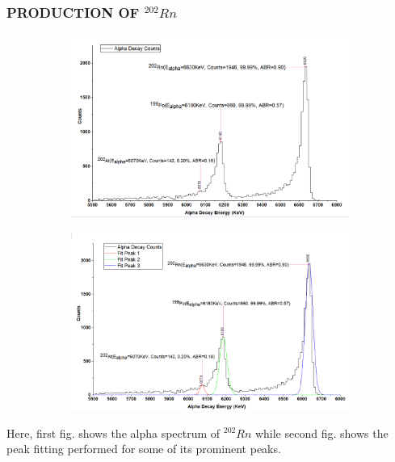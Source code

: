 \documentclass[12pt]{article}
\begin{document}
\subsubsection{PRODUCTION OF $^{202}Rn$}
\begin{figure}[h]
\centering
 \begin{subfigure}
\centering
\includegraphics[scale=0.49]{Rn202.png}
\end{subfigure}
\hfill
\begin{subfigure}
\centering
\includegraphics[scale=0.49]{Rn202(Peak Fitting).png}
\end{subfigure}
\label{First fig shows the alpha spectrum of Rn 202 and second fig shows the peak fitting for its prominent peaks.}
\end{figure}
Here, first fig. shows the alpha spectrum of $^{202}Rn$ while second fig. shows the peak fitting performed for some of its prominent peaks.
\clearpage
\end{document}
